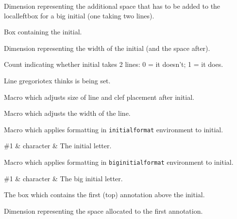 Dimension representing the additional space that has to be added to
the localleftbox for a big initial (one taking two lines).

Box containing the initial.

Dimension representing the width of the initial (and the space after).

Count indicating whether initial takes 2 lines: 0 = it doesn't; 1 = it
does.

Line gregoriotex thinks is being set.

Macro which adjusts size of line and clef placement after initial.

Macro which adjusts the width of the line.

Macro which applies formatting in \verb=initialformat= environment to
initial.

\begin{argtable}
  \#1 & character & The initial letter.\\
\end{argtable}

Macro which applies formatting in \verb=biginitialformat= environment
to initial.

\begin{argtable}
  \#1 & character & The big initial letter.\\
\end{argtable}

The box which contains the first (top) annotation above the initial.

Dimension representing the space allocated to the first annotation.

